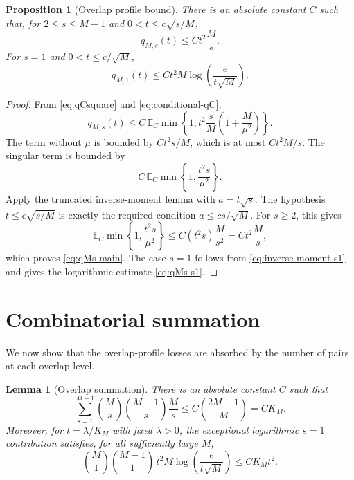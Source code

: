 \documentclass[11pt]{article}
\newtheorem{proposition}{Proposition}
\newtheorem{lemma}{Lemma}
\newcommand{\Ebb}{\mathbb E}
\newcommand{\1}{\mathbf 1}
\begin{document}
\begin{proposition}[Overlap profile bound]
\label{prop:overlap-profile-bound}
There is an absolute constant \(C\) such that, for \(2\le s\le M-1\) and
\(0<t\le c\sqrt{s/M}\),
\begin{equation}
        q_{M,s}(t)
        \le
        C t^2\frac{M}{s}.
        \label{eq:qMs-main}
\end{equation}
For \(s=1\) and \(0<t\le c/\sqrt M\),
\begin{equation}
        q_{M,1}(t)
        \le
        C t^2 M\log\left(\frac{e}{t\sqrt M}\right).
        \label{eq:qMs-s1}
\end{equation}
\end{proposition}

\begin{proof}
From \eqref{eq:qCsquare} and \eqref{eq:conditional-qC},
\[
        q_{M,s}(t)
        \le
        C\,\Ebb_C
        \min\left\{
        1,
        t^2\frac{s}{M}
        \left(1+\frac{M}{\mu^2}\right)
        \right\}.
\]
The term without \(\mu\) is bounded by \(Ct^2s/M\), which is at most
\(Ct^2M/s\).  The singular term is bounded by
\[
        C\,\Ebb_C
        \min\left\{
        1,
        \frac{t^2s}{\mu^2}
        \right\}.
\]
Apply the truncated inverse-moment lemma with \(a=t\sqrt s\).  The hypothesis
\(t\le c\sqrt{s/M}\) is exactly the required condition
\(a\le cs/\sqrt M\).  For \(s\ge2\), this gives
\[
        \Ebb_C
        \min\left\{1,\frac{t^2s}{\mu^2}\right\}
        \le
        C(t^2s)\frac{M}{s^2}
        =
        C t^2\frac{M}{s},
\]
which proves \eqref{eq:qMs-main}.  The case \(s=1\) follows from
\eqref{eq:inverse-moment-s1} and gives the logarithmic estimate \eqref{eq:qMs-s1}.
\end{proof}

\section{Combinatorial summation}

We now show that the overlap-profile losses are absorbed by the number of pairs at each
overlap level.

\begin{lemma}[Overlap summation]
There is an absolute constant \(C\) such that
\begin{equation}
        \sum_{s=1}^{M-1}\binom Ms\binom{M-1}s\frac{M}{s}
        \le
        C\binom{2M-1}{M}
        =C K_M.
        \label{eq:comb-sum}
\end{equation}
Moreover, for \(t=\lambda/K_M\) with fixed \(\lambda>0\), the exceptional logarithmic
\(s=1\) contribution satisfies, for all sufficiently large \(M\),
\begin{equation}
        \binom M1\binom{M-1}1\,t^2 M
        \log\left(\frac{e}{t\sqrt M}\right)
        \le
        C K_M t^2.
        \label{eq:s1-negligible}
\end{equation}
\end{lemma}
\end{document}
